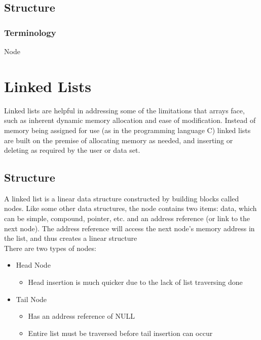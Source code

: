 \documentclass[hidelinks,11pt]{article}
\begin{document}
\subsection{Structure}
\subsubsection{Terminology}
Node\\
\section{Linked Lists}
Linked lists are helpful in addressing some of the limitations that arrays face, such as inherent dynamic memory allocation and ease of modification. Instead of memory being assigned for use (as in the programming language C) linked lists are built on the premise of allocating memory as needed, and inserting or deleting as required by the user or data set.
\subsection{Structure}
A linked list is a linear data structure constructed by building blocks called nodes. Like some other data structures, the node contains two items: data, which can be simple, compound, pointer, etc. and an address reference (or link to the next node). The address reference will access the next node's memory address in the list, and thus creates a linear structure\\

There are two types of nodes:
\begin{itemize}
    \item Head Node
    \begin{itemize}
        \item Head insertion is much quicker due to the lack of list traversing done
    \end{itemize}
    \item Tail Node
    \begin{itemize}
        \item Has an address reference of NULL
        \item Entire list must be traversed before tail insertion can occur
    \end{itemize}
\end{itemize}
\end{document}
